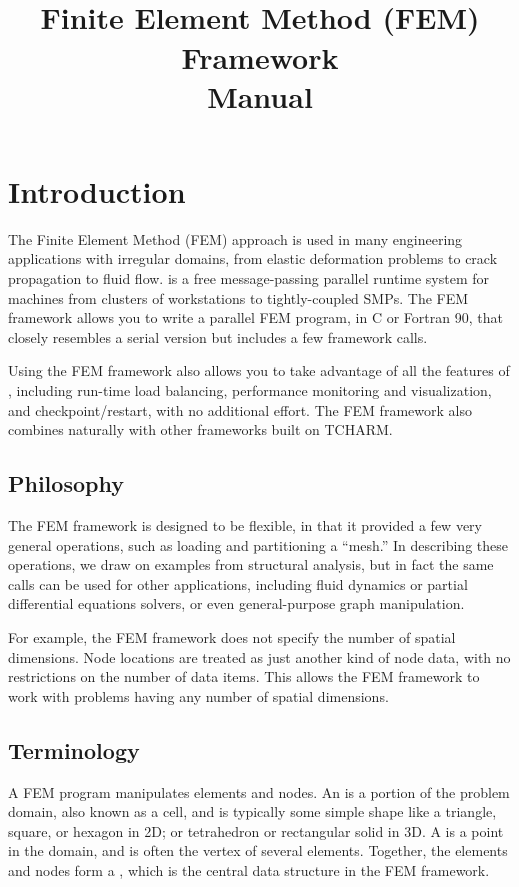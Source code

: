 \documentclass[10pt]{article}
\title{\charmpp\\ Finite Element Method (FEM) Framework\\ Manual}
\begin{document}
\maketitle

\section{Introduction}

The Finite Element Method (FEM) approach is used in many engineering
applications with irregular domains, from elastic deformation problems to
crack propagation to fluid flow.  \charmpp{} is a free message-passing parallel
runtime system for machines from clusters of workstations to tightly-coupled
SMPs.  The \charmpp{} FEM framework allows you to write a parallel FEM program,
in C or Fortran 90, that closely resembles a serial version but includes
a few framework calls.

Using the FEM framework also allows you to take advantage of all the
features of \charmpp, including run-time load balancing,  performance
monitoring and visualization, and checkpoint/restart, with no additional
effort. The FEM framework also combines naturally with other \charmpp
frameworks built on TCHARM.

\subsection{Philosophy}

The \charmpp{} FEM framework is designed to be flexible, in that it
provided a few very general operations, such as loading and partitioning 
a ``mesh.''  
In describing these operations, we draw on examples from structural analysis,
but in fact the same calls can be used for other applications, including
fluid dynamics or partial differential equations solvers, or
even general-purpose graph manipulation.

For example, the FEM framework does not specify the number of spatial
dimensions.  Node locations are treated as just another kind of node data,
with no restrictions on the number of data items.
This allows the FEM framework to work with problems having any number 
of spatial dimensions.


\subsection{Terminology}
\label{sec:terminology}

A FEM program manipulates elements and nodes. An  is a portion of
the problem domain, also known as a cell, and is typically some simple shape 
like a triangle, square, or hexagon in 2D; or tetrahedron or rectangular solid in 3D.  
A  is a point in the domain, and is often the vertex of several elements.  
Together, the elements and nodes form a , which is the 
central data structure in the FEM framework.
\end{document}
